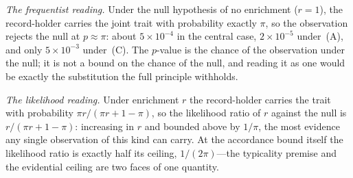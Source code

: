 \documentclass{article}
\begin{document}
\emph{The frequentist reading.} Under the null hypothesis of no enrichment ($r = 1$), the record-holder carries the joint trait with probability exactly $\pi$, so the observation rejects the null at $p \approx \pi$: about $5 \times 10^{-4}$ in the central case, $2 \times 10^{-5}$ under~(A), and only $5 \times 10^{-3}$ under~(C). The $p$-value is the chance of the observation under the null; it is not a bound on the chance of the null, and reading it as one would be exactly the substitution the full principle withholds.

\emph{The likelihood reading.} Under enrichment $r$ the record-holder carries the trait with probability $\pi r / (\pi r + 1 - \pi)$, so the likelihood ratio of $r$ against the null is $r / (\pi r + 1 - \pi)$: increasing in $r$ and bounded above by $1/\pi$, the most evidence any single observation of this kind can carry. At the accordance bound itself the likelihood ratio is exactly half its ceiling, $1/(2\pi)$---the typicality premise and the evidential ceiling are two faces of one quantity.

\par\smallskip\begin{center}\footnotesize
  \label{tab:app-scen}
  \medskip
\end{center}
\end{document}
